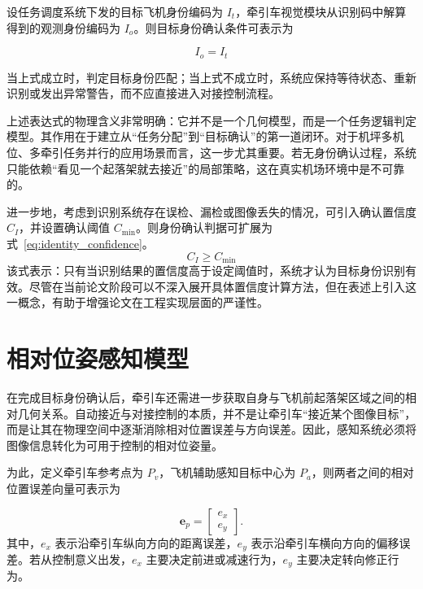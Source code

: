 设任务调度系统下发的目标飞机身份编码为
\(I_{t}\)，牵引车视觉模块从识别码中解算得到的观测身份编码为
\(I_{o}\)。则目标身份确认条件可表示为

\begin{equation}
I_{o} = I_{t}
\label{eq:15}
\end{equation}

当上式成立时，判定目标身份匹配；当上式不成立时，系统应保持等待状态、重新识别或发出异常警告，而不应直接进入对接控制流程。

上述表达式的物理含义非常明确：它并不是一个几何模型，而是一个任务逻辑判定模型。其作用在于建立从``任务分配''到``目标确认''的第一道闭环。对于机坪多机位、多牵引任务并行的应用场景而言，这一步尤其重要。若无身份确认过程，系统只能依赖``看见一个起落架就去接近''的局部策略，这在真实机场环境中是不可靠的。

进一步地，考虑到识别系统存在误检、漏检或图像丢失的情况，可引入确认置信度
\(C_{I}\)，并设置确认阈值
\(C_{\min}\)。则身份确认判据可扩展为式~\ref{eq:identity_confidence}\cite{ref18,ref30}。
\begin{equation}
C_{I} \geq C_{\min}
\label{eq:identity_confidence}
\end{equation}
该式表示：只有当识别结果的置信度高于设定阈值时，系统才认为目标身份识别有效。尽管在当前论文阶段可以不深入展开具体置信度计算方法，但在表述上引入这一概念，有助于增强论文在工程实现层面的严谨性。

\section{相对位姿感知模型}

在完成目标身份确认后，牵引车还需进一步获取自身与飞机前起落架区域之间的相对几何关系。自动接近与对接控制的本质，并不是让牵引车``接近某个图像目标''，而是让其在物理空间中逐渐消除相对位置误差与方向误差。因此，感知系统必须将图像信息转化为可用于控制的相对位姿量\cite{ref18,ref29,ref30}。

为此，定义牵引车参考点为 \(P_{v}\)，飞机辅助感知目标中心为
\(P_{a}\)，则两者之间的相对位置误差向量可表示为

\begin{equation}
\mathbf{e}_{p}=\begin{bmatrix}e_x\\e_y\end{bmatrix}.
\label{eq:position_error}
\end{equation}
其中，\(e_{x}\) 表示沿牵引车纵向方向的距离误差，\(e_{y}\)
表示沿牵引车横向方向的偏移误差。若从控制意义出发，\(e_{x}\)
主要决定前进或减速行为，\(e_{y}\) 主要决定转向修正行为。

